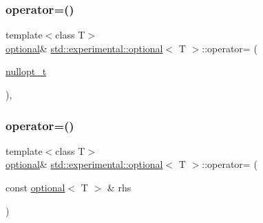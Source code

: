 \subsubsection{\texorpdfstring{operator=()}{operator=()}\hspace{0.1cm}{\footnotesize\ttfamily [1/4]}}
{\footnotesize\ttfamily template$<$class T$>$ \\
\mbox{\hyperlink{classstd_1_1experimental_1_1optional}{optional}}\& \mbox{\hyperlink{classstd_1_1experimental_1_1optional}{std\+::experimental\+::optional}}$<$ T $>$\+::operator= (\begin{DoxyParamCaption}\item[{\mbox{\hyperlink{structstd_1_1experimental_1_1nullopt__t}{nullopt\+\_\+t}}}]{ }\end{DoxyParamCaption})\hspace{0.3cm}{\ttfamily [inline]}, {\ttfamily [noexcept]}}

\mbox{\label{classstd_1_1experimental_1_1optional_a79fc2baa94eb20e81898e351edbe984f}} 
\subsubsection{\texorpdfstring{operator=()}{operator=()}\hspace{0.1cm}{\footnotesize\ttfamily [2/4]}}
{\footnotesize\ttfamily template$<$class T$>$ \\
\mbox{\hyperlink{classstd_1_1experimental_1_1optional}{optional}}\& \mbox{\hyperlink{classstd_1_1experimental_1_1optional}{std\+::experimental\+::optional}}$<$ T $>$\+::operator= (\begin{DoxyParamCaption}\item[{const \mbox{\hyperlink{classstd_1_1experimental_1_1optional}{optional}}$<$ T $>$ \&}]{rhs }\end{DoxyParamCaption})\hspace{0.3cm}{\ttfamily [inline]}}

\mbox{\label{classstd_1_1experimental_1_1optional_a458e0eb811fd30159370230cb977ab7a}} 
